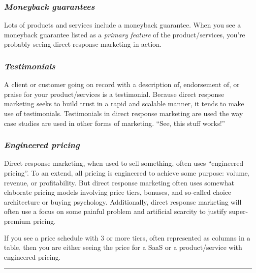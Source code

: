 \documentclass[13pt,]{tufte-handout}
\begin{document}
\hypertarget{moneyback-guarantees}{%
\subsubsection{\texorpdfstring{\emph{Moneyback
guarantees}}{Moneyback guarantees}}\label{moneyback-guarantees}}

Lots of products and services include a moneyback guarantee. When you
see a moneyback guarantee listed as a \emph{primary feature} of the
product/services, you're probably seeing direct response marketing in
action.

\hypertarget{testimonials}{%
\subsubsection{\texorpdfstring{\emph{Testimonials}}{Testimonials}}\label{testimonials}}

A client or customer going on record with a description of, endorsement
of, or praise for your product/services is a testimonial. Because direct
response marketing seeks to build trust in a rapid and scalable manner,
it tends to make use of testimonials. Testimonials in direct response
marketing are used the way case studies are used in other forms of
marketing. ``See, this stuff works!''

\hypertarget{engineered-pricing}{%
\subsubsection{\texorpdfstring{\emph{Engineered
pricing}}{Engineered pricing}}\label{engineered-pricing}}

Direct response marketing, when used to sell something, often uses
``engineered pricing''. To an extend, all pricing is engineered to
achieve some purpose: volume, revenue, or profitability. But direct
response marketing often uses somewhat elaborate pricing models
involving price tiers, bonuses, and so-called choice architecture or
buying psychology. Additionally, direct response marketing will often
use a focus on some painful problem and artificial scarcity to justify
super-premium pricing.

If you see a price schedule with 3 or more tiers, often represented as
columns in a table, then you are either seeing the price for a SaaS or a
product/service with engineered pricing.

\begin{center}\rule{0.5\linewidth}{\linethickness}\end{center}
\end{document}
